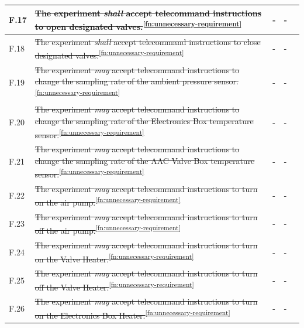 \documentclass[a4paper,12pt,twoside, final]{article}
\begin{document}
\begin{longtable}[]{|m{}| m{} |m{} |m{}|m{}|}
F.17 & \st{The experiment \textit{shall} accept telecommand instructions to open designated valves.}\textsuperscript{\ref{fn:unnecessary-requirement}} &- &- & \\ \hline
F.18 & \st{The experiment \textit{shall} accept telecommand instructions to close designated valves.}\textsuperscript{\ref{fn:unnecessary-requirement}} &- &- & \\ \hline
F.19 & \st{The experiment \textit{may} accept telecommand instructions to change the sampling rate of the ambient pressure sensor.}\textsuperscript{\ref{fn:unnecessary-requirement}} &- &- & \\ \hline
F.20 & \st{The experiment \textit{may} accept telecommand instructions to change the sampling rate of the Electronics Box temperature sensor.}\textsuperscript{\ref{fn:unnecessary-requirement}} &- &- & \\ \hline
F.21 & \st{The experiment \textit{may} accept telecommand instructions to change the sampling rate of the AAC Valve Box temperature sensor.}\textsuperscript{\ref{fn:unnecessary-requirement}}& -&-&\\ \hline
F.22 & \st{The experiment \textit{may} accept telecommand instructions to turn on the air pump.}\textsuperscript{\ref{fn:unnecessary-requirement}}                                                                                              &      -        & -            &        \\ \hline
F.23 & \st{The experiment \textit{may} accept telecommand instructions to turn off the air pump.}\textsuperscript{\ref{fn:unnecessary-requirement}}                                                                                             &      -       & -            &        \\ \hline
F.24 & \st{The experiment \textit{may} accept telecommand instructions to turn on the Valve Heater.}\textsuperscript{\ref{fn:unnecessary-requirement}}                                                                                          &      -        & -            &        \\ \hline
F.25 & \st{The experiment \textit{may} accept telecommand instructions to turn off the Valve Heater.}\textsuperscript{\ref{fn:unnecessary-requirement}}                                                                                         &      -        & -            &        \\ \hline
F.26 & \st{The experiment \textit{may} accept telecommand instructions to turn on the Electronics Box Heater.}\textsuperscript{\ref{fn:unnecessary-requirement}}                                                                                     &      -        & -            &        \\ \hline

\end{longtable}
\end{document}
